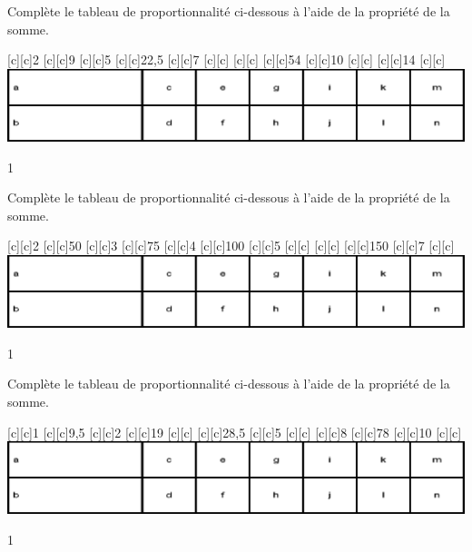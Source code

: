 \documentclass[a4paper,11pt]{report}
\begin{document}
\begin{exop}{
Complète le tableau de proportionnalité ci-dessous à l'aide de la propriété de la somme.
\begin{center}
[c][c]{2}
[c][c]{9}
[c][c]{5}
[c][c]{22,5}
[c][c]{7}
[c][c]{}
[c][c]{}
[c][c]{54}
[c][c]{10}
[c][c]{}
[c][c]{14}
[c][c]{}
\includegraphics[scale=.9]{media/fa-30/tableaut.eps}
\end{center}
\vspace{-0.5cm}}{1}
\end{exop}
\begin{exop}{
Complète le tableau de proportionnalité ci-dessous à l'aide de la propriété de la somme.
\begin{center}
[c][c]{2}
[c][c]{50}
[c][c]{3}
[c][c]{75}
[c][c]{4}
[c][c]{100}
[c][c]{5}
[c][c]{}
[c][c]{}
[c][c]{150}
[c][c]{7}
[c][c]{}
\includegraphics[scale=.9]{media/fa-30/tableaut.eps}
\end{center}
\vspace{-0.5cm}}{1}
\end{exop}
\begin{exop}{
Complète le tableau de proportionnalité ci-dessous à l'aide de la propriété de la somme.
\begin{center}
[c][c]{1}
[c][c]{9,5}
[c][c]{2}
[c][c]{19}
[c][c]{}
[c][c]{28,5}
[c][c]{5}
[c][c]{}
[c][c]{8}
[c][c]{78}
[c][c]{10}
[c][c]{}
\includegraphics[scale=.9]{media/fa-30/tableaut.eps}
\end{center}
\vspace{-0.5cm}}{1}
\end{exop}
\end{document}
